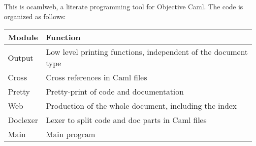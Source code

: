 
\newcommand{\ocamlweb}{\textsf{ocamlweb}}
\newcommand{\ocaml}{\textsf{Objective Caml}}

\ocwsection
This is \ocamlweb, a literate programming tool for \ocaml.
The code is organized as follows:

\begin{center}
\begin{tabular}{|l|l|}
  \hline
  \bf Module  &  \bf Function \\
  \hline\hline
  Output  &  Low level printing functions, independent of the document
  type \\
  \hline
  Cross   & Cross references in Caml files \\
  \hline
  Pretty  & Pretty-print of code and documentation \\
  \hline
  Web     & Production of the whole document, including the index \\
  \hline
  Doclexer& Lexer to split code and doc parts in Caml files \\
  \hline
  Main    & Main program \\
  \hline
\end{tabular}
\end{center}
